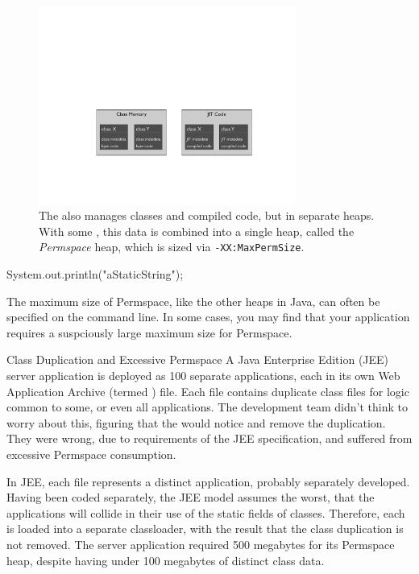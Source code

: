 \begin{figure}
\centering
\includegraphics[width=0.75\textwidth]{part2/Figures/lifetime/heaps_and_stacks_classes}
\caption{The \jre also manages classes and compiled code, but in separate
	heaps. With some \jres, this data is combined into a single heap, called the
	\emph{Permspace} heap, which is sized via {\tt -XX:MaxPermSize}.}
\label{fig:heaps_and_stacks_classes}
\end{figure}


\begin{shortlisting}
System.out.println("aStaticString");
\end{shortlisting} 

The maximum size of Permspace, like the other heaps in Java, can often be
specified on the command line. In some cases, you may find that your application
requires a suspciously large maximum size for Permspace.
 
\begin{example}{Class Duplication and Excessive Permspace}
A Java Enterprise Edition (JEE) server application is deployed as 100 separate
applications, each in its own Web Application Archive (termed ) file.
Each  file contains duplicate class files for logic common to some, or even all applications.
The development team didn't think to worry about this, figuring that the
\jre would notice and remove the duplication. They were wrong, due to
requirements of the JEE specification, and suffered from excessive Permspace
consumption.

In JEE, each  file represents a distinct application, probably
separately developed. Having been coded separately, the JEE model assumes the
worst, that the applications will collide in their use of the static fields of
classes. Therefore, each  is loaded into a separate classloader, with
the result that the class duplication is not removed. The server application
required 500 megabytes for its Permspace heap, despite having under 100 megabytes
of distinct class data.
\end{example}



